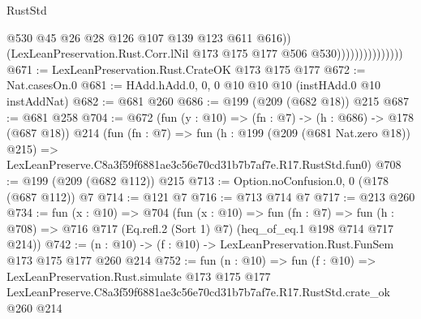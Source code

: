 \begin{lexlean}{RustStd}
\begin{coremodule}
                                    @530
                                    @45
                                    @26
                                    @28
                                    @126
                                    @107
                                    @139
                                    @123
                                    @611
                                    @616))
                                (LexLeanPreservation.Rust.Corr.lNil
                                  @173
                                  @175
                                  @177
                                  @506
                                  @530)))))))))))))))
@671 := LexLeanPreservation.Rust.CrateOK @173 @175 @177
@672 := Nat.casesOn.{0}
@681 := HAdd.hAdd.{0, 0, 0} @10 @10 @10 (instHAdd.{0} @10 instAddNat)
@682 := @681 @260
@686 := @199 (@209 (@682 @18)) @215
@687 := @681 @258
@704 := @672
    (fun (y : @10) => (fn : @7) -> (h : @686) -> @178 (@687 @18))
    @214
    (fun (fn : @7) =>
    fun (h : @199 (@209 (@681 Nat.zero @18)) @215) =>
    LexLeanPreserve.C8a3f59f6881ae3c56e70cd31b7b7af7e.R17.RustStd.fun0)
@708 := @199 (@209 (@682 @112)) @215
@713 := Option.noConfusion.{0, 0} (@178 (@687 @112)) @7
@714 := @121 @7
@716 := @713 @714 @7
@717 := @213 @260
@734 := fun (x : @10) =>
  @704
    (fun (x : @10) =>
    fun (fn : @7) =>
    fun (h : @708) => @716 @717 (Eq.refl.{2} (Sort 1) @7) (heq_of_eq.{1} @198 @714 @717 @214))
@742 := (n : @10) -> (f : @10) -> LexLeanPreservation.Rust.FunSem @173 @175 @177 @260 @214
@752 := fun (n : @10) =>
  fun (f : @10) =>
  LexLeanPreservation.Rust.simulate
    @173
    @175
    @177
    LexLeanPreserve.C8a3f59f6881ae3c56e70cd31b7b7af7e.R17.RustStd.crate_ok
    @260
    @214
\end{coremodule}
\end{lexlean}
